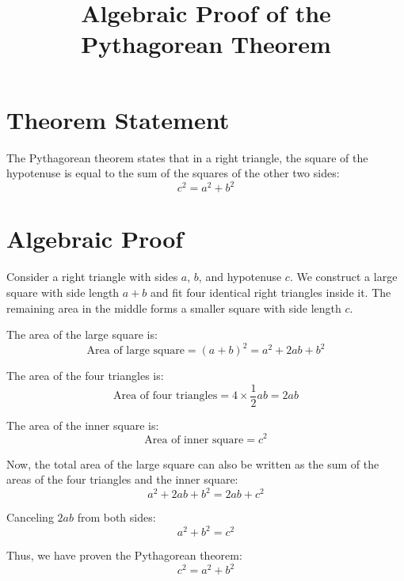 \documentclass{article}
\begin{document}
\title{Algebraic Proof of the Pythagorean Theorem}
\author{}
\date{}
\maketitle

\section*{Theorem Statement}
The Pythagorean theorem states that in a right triangle, the square of the hypotenuse is equal to the sum of the squares of the other two sides:
\[
c^2 = a^2 + b^2
\]

\section*{Algebraic Proof}

Consider a right triangle with sides \(a\), \(b\), and hypotenuse \(c\). We construct a large square with side length \(a + b\) and fit four identical right triangles inside it. The remaining area in the middle forms a smaller square with side length \(c\).

\begin{center}
\end{center}

The area of the large square is:
\[
\text{Area of large square} = (a + b)^2 = a^2 + 2ab + b^2
\]

The area of the four triangles is:
\[
\text{Area of four triangles} = 4 \times \frac{1}{2}ab = 2ab
\]

The area of the inner square is:
\[
\text{Area of inner square} = c^2
\]

Now, the total area of the large square can also be written as the sum of the areas of the four triangles and the inner square:
\[
a^2 + 2ab + b^2 = 2ab + c^2
\]

Canceling \(2ab\) from both sides:
\[
a^2 + b^2 = c^2
\]

Thus, we have proven the Pythagorean theorem:
\[
c^2 = a^2 + b^2
\]
\end{document}
